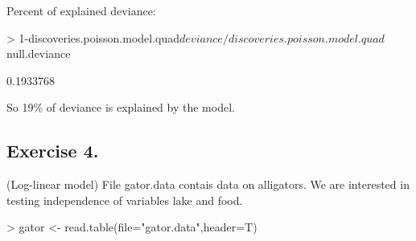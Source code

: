 \documentclass[a4paper]{article}
\begin{document}
\begin{itemize}
Percent of explained deviance:
\begin{Schunk}
\begin{Sinput}
> 1-discoveries.poisson.model.quad$deviance/discoveries.poisson.model.quad$null.deviance	
\end{Sinput}
\begin{Soutput}
[1] 0.1933768
\end{Soutput}
\end{Schunk}
So 19\% of deviance is explained by the model.
\end{itemize}

\subsection{Exercise 4.} (Log-linear model) File gator.data contais data on
alligators. We are interested in testing independence of variables lake and food.
\begin{Schunk}
\begin{Sinput}
> gator <- read.table(file="gator.data",header=T)	
\end{Sinput}
\end{Schunk}
\end{document}
